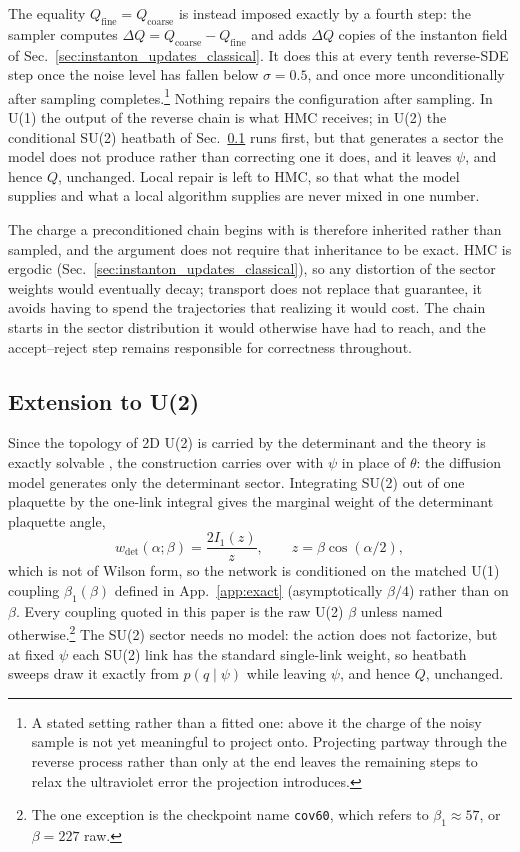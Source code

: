 \documentclass[prd, twocolumn, superscriptaddress, nofootinbib,floatfix]{revtex4-2}
\DeclareRobustCommand{\app}[1]{App.~\ref{app:#1}}
\DeclareRobustCommand{\sect}[1]{Sec.~\ref{sec:#1}}
\begin{document}
The equality $Q_{\mathrm{fine}}=Q_{\mathrm{coarse}}$ is instead imposed
exactly by a fourth step: the sampler computes
$\Delta Q = Q_{\mathrm{coarse}} - Q_{\mathrm{fine}}$ and adds $\Delta Q$ copies
of the instanton field of \sect{instanton_updates_classical}. It does this at every tenth reverse-SDE step once the noise level
has fallen below $\sigma=0.5$, and once more unconditionally after sampling
completes.\footnote{A stated setting rather than a fitted one: above it the charge of the
noisy sample is not yet meaningful to project onto. Projecting partway through
the reverse process rather than only at the end leaves the remaining steps to
relax the ultraviolet error the projection introduces.}
Nothing repairs the configuration after sampling. In U(1) the output of the
reverse chain is what HMC receives; in U(2) the conditional SU(2) heatbath of
\sect{u2-extension} runs first, but that generates a sector the model does not
produce rather than correcting one it does, and it leaves $\psi$, and hence $Q$,
unchanged. Local repair is left to HMC, so that what the model supplies and what
a local algorithm supplies are never mixed in one number.

The charge a preconditioned chain begins with is therefore inherited rather than
sampled, and the argument does not require that inheritance to be exact. HMC is
ergodic (\sect{instanton_updates_classical}), so any distortion of the sector
weights would eventually decay; transport does not replace that guarantee, it
avoids having to spend the trajectories that realizing it would cost. The chain
starts in the sector distribution it would otherwise have had to reach, and the
accept--reject step remains responsible for correctness throughout.

\subsection{Extension to U(2)}
\label{sec:u2-extension}

Since the topology of 2D U(2) is carried by the determinant and the theory is
exactly solvable \cite{bonatirossi2019}, the construction carries over with
$\psi$ in place of $\theta$: the diffusion model generates only the determinant
sector. Integrating SU(2) out of one plaquette by the one-link integral
\cite{creutz1980} gives the marginal weight of the determinant plaquette angle,
\begin{equation}
    w_{\det}(\alpha;\beta) = \frac{2I_1(z)}{z},
    \qquad z=\beta\cos(\alpha/2),
    \label{eq:wdet}
\end{equation}
which is not of Wilson form, so the network is conditioned on the matched U(1)
coupling $\beta_1(\beta)$ defined in \app{exact} (asymptotically $\beta/4$)
rather than on $\beta$. Every coupling quoted in this paper is the raw U(2)
$\beta$ unless named otherwise.\footnote{The one exception is the checkpoint
name \texttt{cov60}, which refers to $\beta_1\approx57$, or $\beta=227$ raw.}
The SU(2) sector needs no model: the action does not factorize, but at fixed
$\psi$ each SU(2) link has the standard single-link weight, so heatbath sweeps
\cite{creutz1980,kennedypendleton1985} draw it exactly from
$p(q\mid\psi)$ while leaving $\psi$, and hence $Q$, unchanged.
\end{document}
